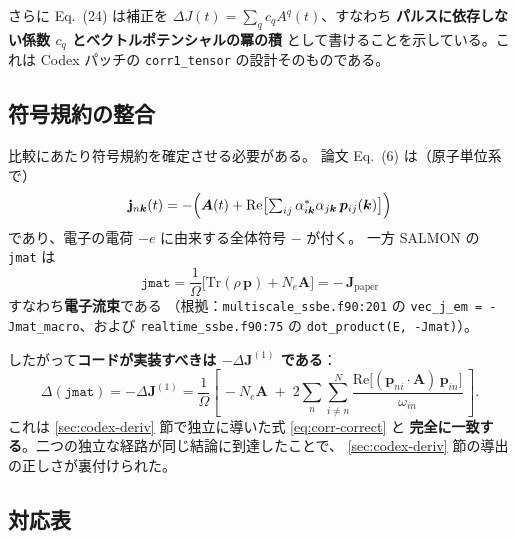 \documentclass[dvipdfmx,a4paper,11pt]{jsarticle}
\newcommand{\file}[1]{\texttt{#1}}
\newcommand{\vk}{\bm{k}}
\newcommand{\vA}{\bm{A}}
\newcommand{\vp}{\bm{p}}
\newcommand{\Tr}{\mathrm{Tr}}
\newcommand{\Real}{\mathrm{Re}}
\begin{document}
さらに Eq.~(24) は補正を
$\Delta J(t) = \sum_q c_q A^q(t)$、すなわち
\textbf{パルスに依存しない係数 $c_q$ とベクトルポテンシャルの冪の積}
として書けることを示している。これは Codex パッチの
\verb|corr1_tensor| の設計そのものである。

\subsection{符号規約の整合}
\label{sec:vlad-sign}

比較にあたり符号規約を確定させる必要がある。
論文 Eq.~(6) は（原子単位系で）
%
\begin{equation}
  \mathbf{j}_{n\vk}(t) = -\Bigl(\vA(t) + \Real\bigl[\textstyle\sum_{ij}
    \alpha^*_{i\vk}\alpha_{j\vk}\,\vp_{ij}(\vk)\bigr]\Bigr)
  \label{eq:vlad-6}
\end{equation}
%
であり、電子の電荷 $-e$ に由来する全体符号 $-$ が付く。
一方 SALMON の \verb|jmat| は
%
\begin{equation}
  \texttt{jmat} = \frac{1}{\Omega}\bigl[\Tr(\rho\,\vp) + N_e\vA\bigr]
  = -\,\mathbf{J}_{\mathrm{paper}}
  \label{eq:jmat-sign}
\end{equation}
%
すなわち\textbf{電子流束}である
（根拠：\file{multiscale\_ssbe.f90:201} の
 \verb|vec_j_em = -Jmat_macro|、および
 \file{realtime\_ssbe.f90:75} の \verb|dot_product(E, -Jmat)|）。

したがって\textbf{コードが実装すべきは $-\Delta\mathbf{J}^{(1)}$ である}：
%
\begin{equation}
  \Delta(\texttt{jmat})
  = -\Delta \mathbf{J}^{(1)}
  = \frac{1}{\Omega}\left[\,
      -N_e\vA
      \;+\; 2\sum_{n}\sum_{i\neq n}^{N}
        \frac{\Real\bigl[(\vp_{ni}\cdot\vA)\,\vp_{in}\bigr]}{\omega_{in}}
    \,\right].
  \label{eq:vlad-required}
\end{equation}
%
これは \ref{sec:codex-deriv} 節で独立に導いた式 \eqref{eq:corr-correct} と
\textbf{完全に一致する}。二つの独立な経路が同じ結論に到達したことで、
\ref{sec:codex-deriv} 節の導出の正しさが裏付けられた。

\subsection{対応表}
\end{document}
